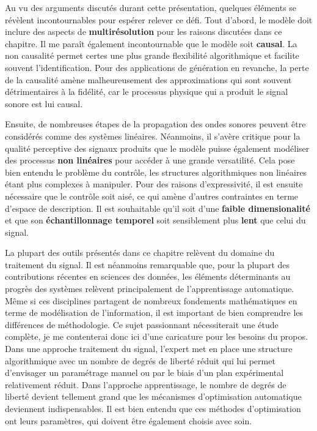 Au vu des arguments discutés durant cette présentation, quelques éléments se révèlent incontournables pour espérer relever ce défi. Tout d'abord, le modèle doit inclure des aspects de \textbf{multirésolution} pour les raisons discutées dans ce chapitre. Il me paraît également incontournable que le modèle soit \textbf{causal}. La non causalité permet certes une plus grande flexibilité algorithmique et facilite souvent l'identification. Pour des applications de génération en revanche, la perte de la causalité amène malheureusement des approximations qui sont souvent détrimentaires à la fidélité, car le processus physique qui a produit le signal sonore est lui causal.

Ensuite, de nombreuses étapes de la propagation des ondes sonores peuvent être considérés comme des systèmes linéaires. Néanmoins, il s'avère critique pour la qualité perceptive des signaux produits que le modèle puisse également modéliser des processus \textbf{non linéaires} pour accéder à une grande versatilité. Cela pose bien entendu le problème du contrôle, les structures algorithmiques non linéaires étant plus complexes à manipuler. Pour des raisons d'expressivité, il est ensuite nécessaire que le contrôle soit aisé, ce qui amène d'autres contraintes en terme d'espace de description. Il est souhaitable qu'il soit d'une \textbf{faible dimensionalité} et que son \textbf{échantillonnage temporel} soit sensiblement plus \textbf{lent} que celui du signal.

La plupart des outils présentés dans ce chapitre relèvent du domaine du traitement du signal. Il est néanmoins remarquable que, pour la plupart des contributions récentes en sciences des données, les éléments déterminants au progrès des systèmes relèvent principalement de l'apprentissage automatique. Même si ces disciplines partagent de nombreux fondements mathématiques en terme de modélisation de l'information, il est important de bien comprendre les différences de méthodologie. Ce sujet passionnant nécessiterait une étude complète, je me contenterai donc ici d'une caricature pour les besoins du propos. Dans une approche traitement du signal, l'expert met en place une structure algorithmique avec un nombre de degrés de liberté réduit qui lui permet d'envisager un paramétrage manuel ou par le biais d'un plan expérimental relativement réduit. Dans l'approche apprentissage, le nombre de degrés de liberté devient tellement grand que les mécanismes d'optimisation automatique deviennent indispensables. Il est bien entendu que ces méthodes d'optimisation ont leurs paramètres, qui doivent être également choisis avec soin.

